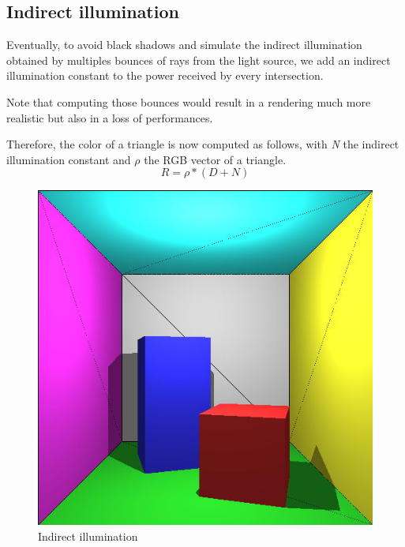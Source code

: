 \subsection{Indirect illumination}
Eventually, to avoid black shadows and simulate the indirect illumination obtained by multiples bounces of rays from the light source, we add an indirect illumination constant to the power received by every intersection.

Note that computing those bounces would result in a rendering much more realistic but also in a loss of performances.

Therefore, the color of a triangle is now computed as follows, with \textit{N} the indirect illumination constant and $\rho$ the RGB vector of a triangle.
\begin{equation}
R = \rho * (D+N)
\end{equation}

\begin{figure}[H]
\centering
\includegraphics[width=0.35\linewidth]{img/ind_light.jpg}
\caption{Indirect illumination}
\end{figure}